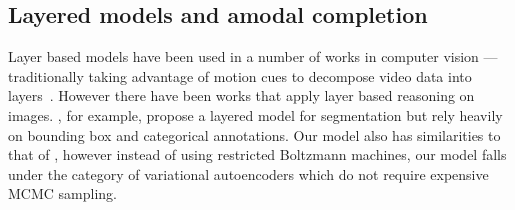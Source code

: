 \subsection{Layered models and amodal completion}
Layer based models have been used in a number of works in computer vision  --- traditionally
taking advantage of motion cues to decompose video data into layers~\cite{wang1994representing,ayer1995layered,kannan2005generative}.
However there have been works that apply layer based reasoning on images.
\cite{yang2012layered}, for example, propose a layered model for segmentation but rely heavily on bounding box and categorical annotations.	
Our model also has similarities to that of \cite{le2011learning}, however instead of using restricted Boltzmann machines, our model
falls under the category of variational autoencoders which do not require expensive MCMC sampling.	
	
	
	


	
	
	
		
	
	
	
	
	
	
	

